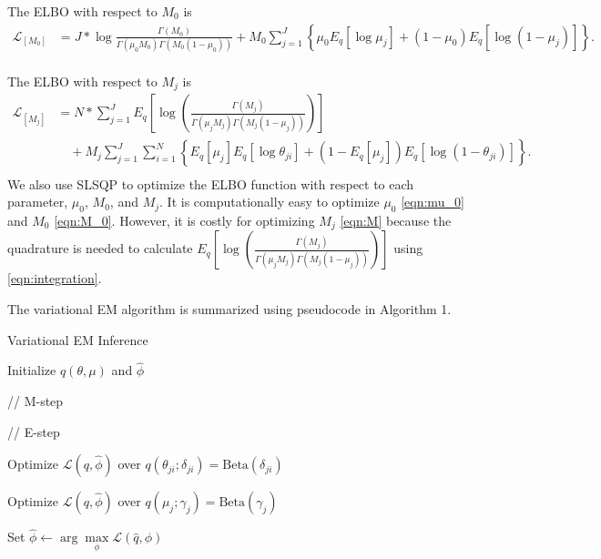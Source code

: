 \documentclass[11pt,reqno]{amsart}
\begin{document}
The ELBO with respect to $ M_0 $ is
\begin{equation}\label{eqn:M_0}
\begin{split}
\mathcal{L}_{[M_0]}
&=J* \log \frac{ \Gamma(M_0) } { \Gamma(\mu_0 M_0) \Gamma(M_0 (1-\mu_0))}
+ M_0 \sum_{j=1}^{J} \left\lbrace \mu_0E_q  \left[ \log \mu_j \right] + ( 1 - \mu_0) E_q  \left[ \log (1 - \mu_j)\right]\right\rbrace.  \\
\end{split}
\end{equation}


The ELBO with respect to $M_j$ is
\begin{equation}\label{eqn:M}
\begin{split}
\mathcal{L}_{{[M_j]}}
&= N* \sum_{j=1}^{J} E_q  \left[ \log \left( \frac{ \Gamma(M_j) } { \Gamma(\mu_j M_j) \Gamma(M_j (1-\mu_j)) }\right) \right] \\
&\quad + M_j \sum_{j=1}^{J} \sum_{i=1}^{N} \left\lbrace E_q \left[ \mu_j \right] E_q \left[ \log \theta_{ji} \right] + \left( 1 - E_q\left[ \mu_j \right]  \right) E_q\left[ \log \left( 1 - \theta_{ji}\right) \right] \right\rbrace. \\
\end{split}
\end{equation}
We also use SLSQP to optimize the ELBO function with respect to each parameter, $\mu_0$, $M_0$, and $M_j$.
It is computationally easy to optimize $\mu_0$ \eqref{eqn:mu_0} and $M_0$ \eqref{eqn:M_0}.
However, it is costly for optimizing $M_j$ \eqref{eqn:M} because the quadrature is needed to calculate $ E_q\left[ \log \left( \frac{ \Gamma(M_j) } { \Gamma(\mu_j M_j) \Gamma(M_j (1-\mu_j)) }\right)\right] $ using \eqref{eqn:integration}.

The variational EM algorithm is summarized using pseudocode in Algorithm 1.
\begin{algorithm}[ht]
  \caption{Variational EM Inference}

  \begin{algorithmic}[1]

  \State Initialize $q(\theta, \mu)$ and $\hat{\phi}$

  \State // M-step
   
  \Repeat 
  
    \State // E-step  
     
	\Repeat 

			\State Optimize $\mathcal{L}(q, \hat{\phi})$ over $q(\theta_{ji}; \delta_{ji}) = \text{Beta} (\delta_{ji})$
			\EndFor
		\EndFor

            \State Optimize $\mathcal{L}(q, \hat{\phi})$ over $q(\mu_j; \gamma_j) = \text{Beta} (\gamma_j)$
        \EndFor


    \State Set $\hat{\phi} \leftarrow \arg \max\limits_{\phi}
            \mathcal{L}(\hat{q},\phi)$

  \end{algorithmic}

\end{algorithm}
%
\end{document}
